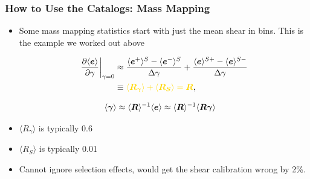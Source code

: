 \documentclass{beamer}
\newcommand{\mcalR}{\mbox{\boldmath $R$}}
\newcommand{\mcalRg}{\mbox{\boldmath $R_\gamma$}}
\newcommand{\mcalRS}{\mbox{\boldmath $R_S$}}
\newcommand{\mcalRgmean}{\mbox{\boldmath $\langle R_\gamma \rangle$}}
\newcommand{\mcalRSmean}{\mbox{\boldmath $\langle R_S \rangle$}}
\newcommand{\vecg}{\mbox{\boldmath $\gamma$}}
\newcommand{\vest}{\mbox{\boldmath $e$}}
\begin{document}
\frame
{
    \frametitle{How to Use the Catalogs: Mass Mapping}

 
    \begin{itemize}

        \item Some mass mapping statistics start with just the mean
            shear in bins.  This is the example we worked out above

            \begin{align}
                \frac{\partial \langle \vest \rangle}{\partial \gamma}\bigg|_{\gamma=0} &\approx
                \frac{\langle \vest^+ \rangle^S - \langle \vest^- \rangle^S}{\Delta \gamma} + \frac{\langle \vest \rangle^{S+} - \langle \vest \rangle^{S-}}{\Delta \gamma} \nonumber \\
                &\equiv {\color{gold} \langle \mcalRg \rangle + \langle \mcalRS \rangle = \mcalR},
            \end{align}

            {\color{gold}
\begin{align} \label{eq:rcorr}
    \langle \vecg \rangle &\approx \langle \mbox{\mcalR} \rangle^{-1}  \langle \vest \rangle \approx \langle \mbox{\mcalR} \rangle^{-1} \langle \mcalR \vecg \rangle
\end{align}
            }

        \item {\color{gold} \mcalRgmean} is typically 0.6 
        \item {\color{gold} \mcalRSmean} is typically 0.01

        \item Cannot ignore selection effects, would get the shear calibration
            wrong by 2\%.


    \end{itemize}
}
\end{document}
